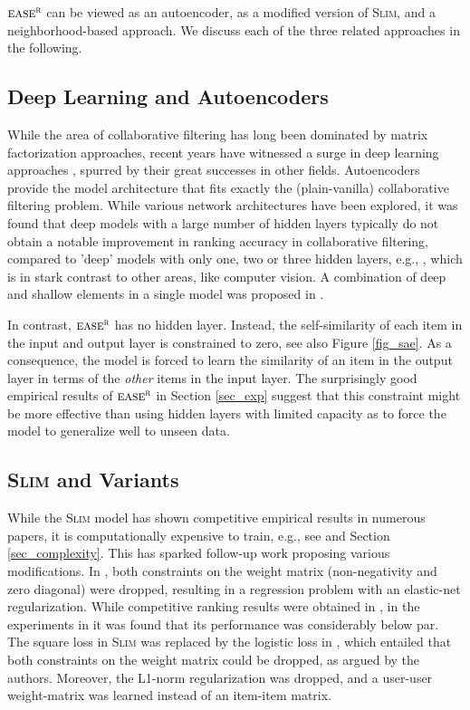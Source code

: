 \documentclass[sigconf]{acmart}
\newcommand{\slim}{{\scshape Slim}}
\newcommand{\sae}{${\textsc{ease}}^{\textsc{r}}$}
\begin{document}
\sae{}  can be viewed as an autoencoder, as a modified version of \slim{}, and  a neighborhood-based approach. We discuss each of the three related approaches in the following.

\subsection{Deep Learning and Autoencoders}
While the area of collaborative filtering has long  been dominated by matrix factorization approaches, recent years have witnessed a surge in deep learning approaches \cite{liang18,sedhain15, zheng16,wu16,he17, hidasi15,hidasi17, cheng16}, spurred by their great successes in other fields. Autoencoders provide the model architecture that fits exactly the (plain-vanilla) collaborative filtering problem. While various network architectures have been explored, it was found that deep models with a large number of hidden layers typically do not obtain a notable improvement in  ranking accuracy in collaborative filtering, compared to 'deep' models with only one, two or three hidden layers, e.g.,  \cite{sedhain15, zheng16,he17,  liang18}, which is in stark contrast to other areas, like computer vision. A combination of deep and shallow elements in a single model was proposed in \cite{cheng16}.

In contrast, \sae{}  has no hidden layer. Instead, the self-similarity of each item in the input and output layer is constrained to zero, see also Figure \ref{fig_sae}. As a consequence, the model is forced to learn the similarity of an item in the output layer in terms of the \emph{other} items in the input layer. The surprisingly good empirical results of \sae{}  in Section \ref{sec_exp} suggest that this constraint might be more effective than using hidden layers with limited capacity as to force the model to generalize well to unseen data. 


\subsection{\slim{}  and Variants}
While the \slim{} model \cite{ning11} has shown competitive empirical results in numerous papers, it is  computationally expensive to train, e.g., see  \cite{ning11,liang18} and Section \ref{sec_complexity}. This has sparked follow-up work proposing various modifications. In \cite{levy13}, both constraints on the weight matrix (non-negativity and zero diagonal) were dropped, resulting in a regression problem with an elastic-net regularization.   While competitive ranking results were obtained  in \cite{levy13}, in the experiments in \cite{liang18} it was found that its performance was considerably below par.
The square loss in \slim{} was replaced by the logistic loss in \cite{sedhain16}, which entailed that both constraints on the weight matrix could be dropped, as argued by the authors. Moreover,  the L1-norm regularization was dropped, and a user-user weight-matrix was learned instead of an item-item  matrix. 
\end{document}
